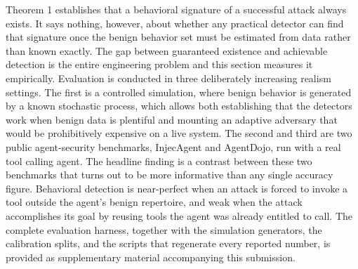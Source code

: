 \documentclass[journal]{IEEEtran}
\theoremstyle{remark}
\begin{document}
Theorem 1 establishes that a behavioral signature of a successful attack always exists. It says nothing, however, about whether any practical detector can find that signature once the benign behavior set must be estimated from data rather than known exactly. The gap between guaranteed existence and achievable detection is the entire engineering problem and this section measures it empirically. Evaluation is conducted in three deliberately increasing realism settings. The first is a controlled simulation, where benign behavior is generated by a known stochastic process, which allows both establishing that the detectors work when benign data is plentiful and mounting an adaptive adversary that would be prohibitively expensive on a live system. The second and third are two public agent-security benchmarks, InjecAgent and AgentDojo, run with a real tool calling agent. The headline finding is a contrast between these two benchmarks that turns out to be more informative than any single accuracy figure. Behavioral detection is near-perfect when an attack is forced to invoke a tool outside the agent's benign repertoire, and weak when the attack accomplishes its goal by reusing tools the agent was already entitled to call. The complete evaluation harness, together with the simulation generators, the calibration splits, and the scripts that regenerate every reported number, is provided as supplementary material accompanying this submission.  
\end{document}
